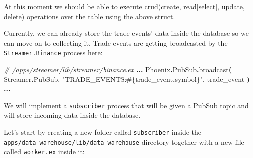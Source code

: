 \documentclass[
  oneside]{book}
\newenvironment{Shaded}{\begin{snugshade}}{\end{snugshade}}
\newcommand{\CommentTok}[1]{\textcolor[rgb]{0.56,0.35,0.01}{\textit{#1}}}
\newcommand{\ConstantTok}[1]{\textcolor[rgb]{0.56,0.35,0.01}{#1}}
\newcommand{\FunctionTok}[1]{\textcolor[rgb]{0.13,0.29,0.53}{\textbf{#1}}}
\newcommand{\NormalTok}[1]{#1}
\newcommand{\OperatorTok}[1]{\textcolor[rgb]{0.81,0.36,0.00}{\textbf{#1}}}
\newcommand{\OtherTok}[1]{\textcolor[rgb]{0.56,0.35,0.01}{#1}}
\newcommand{\StringTok}[1]{\textcolor[rgb]{0.31,0.60,0.02}{#1}}
\begin{document}
At this moment we should be able to execute crud(create, read{[}select{]}, update, delete) operations over the table using the above struct.

Currently, we can already store the trade events' data inside the database so we can move on to collecting it. Trade events are getting broadcasted by the \texttt{Streamer.Binance} process here:

\begin{Shaded}
\begin{Highlighting}[]
    \CommentTok{\# /apps/streamer/lib/streamer/binance.ex}
    \OperatorTok{...}
    \ConstantTok{Phoenix}\OperatorTok{.}\ConstantTok{PubSub}\OperatorTok{.}\NormalTok{broadcast}\FunctionTok{(}
      \ConstantTok{Streamer}\OperatorTok{.}\ConstantTok{PubSub}\NormalTok{,}
      \StringTok{"TRADE\_EVENTS:}\OtherTok{\#\{}\NormalTok{trade\_event}\OperatorTok{.}\NormalTok{symbol}\OtherTok{\}}\StringTok{"}\NormalTok{,}
\NormalTok{      trade\_event}
    \FunctionTok{)}
    \OperatorTok{...}
\end{Highlighting}
\end{Shaded}

We will implement a \texttt{subscriber} process that will be given a PubSub topic and will store incoming data inside the database.

\newpage

Let's start by creating a new folder called \texttt{subscriber} inside the\\
\texttt{apps/data\_warehouse/lib/data\_warehouse} directory together with a new file called \texttt{worker.ex} inside it:
\end{document}
